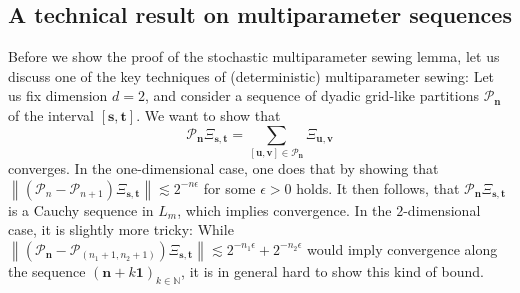 \documentclass[11pt,oneside,english,reqno]{amsart}
\numberwithin{equation}{section}
\numberwithin{figure}{section}
\theoremstyle{plain}
\theoremstyle{definition}
\theoremstyle{remark}
\theoremstyle{plain}
\theoremstyle{plain}
\theoremstyle{plain}
\theoremstyle{plain}
\theoremstyle{plain}
\newcommand{\cP}{\mathcal{P}}
\newcommand{\NN}{\mathbb{N}}
\newcommand{\bn}{\mathbf{n}}
\newcommand{\bu}{\mathbf{u}}
\newcommand{\bv}{\mathbf{v}}
\newcommand{\bs}{\mathbf{s}}
\newcommand{\bt}{\mathbf{t}}
\newcommand{\norm}[1]{\left\lVert #1\right\rVert}
\begin{document}
\subsection{A technical result on multiparameter sequences}

Before we show the proof of the stochastic multiparameter sewing lemma, let us discuss one of the key techniques of (deterministic) multiparameter sewing: Let us fix dimension $d=2$, and consider a sequence of dyadic grid-like partitions $\cP_\bn$ of the interval $[\bs,\bt]$. We want to show that
%
\begin{equation}\label{eq:convergentSequnece}
    \cP_\bn\Xi_{\bs,\bt} = \sum_{[\bu,\bv]\in\cP_\bn}\Xi_{\bu,\bv} 
\end{equation}
%
converges. In the one-dimensional case, one does that by showing that $\norm{(\cP_n-\cP_{n+1})\Xi_{\bs,\bt}}\lesssim 2^{-n\epsilon}$ for some $\epsilon>0$ holds. It then follows, that $\cP_\bn\Xi_{\bs,\bt}$ is a Cauchy sequence in $L_m$, which implies convergence.
%
In the $2$-dimensional case, it is slightly more tricky: While $\norm{(\cP_{\bn}-\cP_{(n_1+1,n_2+1)})\Xi_{\bs,\bt}}\lesssim 2^{-n_1\epsilon}+2^{-n_2\epsilon}$ would imply convergence along the sequence $(\bn+k\boldsymbol 1)_{k\in\NN}$, it is in general hard to show this kind of bound.
\end{document}
